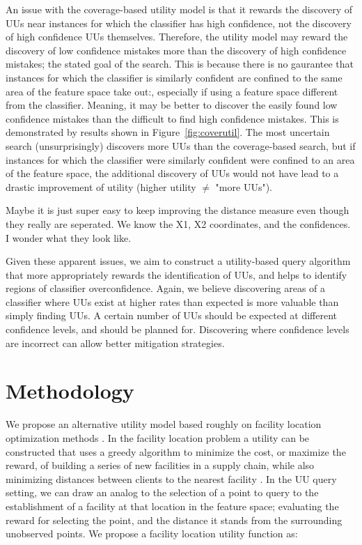 \documentclass[letterpaper]{article} %
\newcommand{\wdb}[1]{{\color{blue} #1}} %
\begin{document}
An issue with the coverage-based utility model is that it rewards the discovery of UUs near instances for which the classifier has high confidence, not the discovery of high confidence UUs themselves.  Therefore, the utility model may reward the discovery of low confidence mistakes more than the discovery of high confidence mistakes; the stated goal of the search. This is because there is no gaurantee that instances for which the classifier is similarly confident are confined to the same area of the feature space \wdb{take out:, especially if using a feature space different from the classifier}.  Meaning, it may be better to discover the easily found low confidence mistakes than the difficult to find high confidence mistakes. This is demonstrated by results shown in Figure~\ref{fig:coverutil}.  The most uncertain search (unsurprisingly) discovers more UUs than the coverage-based search, but if instances for which the classifier were similarly confident were confined to an area of the feature space, the additional discovery of UUs would not have lead to a drastic improvement of utility \wdb{(higher utility $\ne$ "more UUs")}.

\wdb{Maybe it is just super easy to keep improving the distance measure even though they really are seperated.  We know the X1, X2 coordinates, and the confidences.  I wonder what they look like.}

Given these apparent issues, we aim to construct a utility-based query algorithm that more appropriately rewards the identification of UUs, and helps to identify regions of classifier overconfidence.  \wdb{Again, we believe discovering areas of a classifier where UUs exist at higher rates than expected is more valuable than simply finding UUs.  A certain number of UUs should be expected at different confidence levels, and should be planned for.  Discovering where confidence levels are incorrect can allow better mitigation strategies. }

\section{Methodology}

We propose an alternative utility model based roughly on facility location optimization methods  \citep{farahani2009facility}. In the facility location problem a utility can be constructed that uses a greedy algorithm to minimize the cost, or maximize the reward, of building a series of new facilities in a supply chain, while also minimizing distances between clients to the nearest facility  \citep{guha1999greedy, arya2004local}. In the UU query setting, we can draw an analog to the selection of a point to query to the establishment of a facility at that location in the feature space; evaluating the reward for selecting the point, and the distance it stands from the surrounding unobserved points. We propose a facility location utility function as: 
\end{document}
